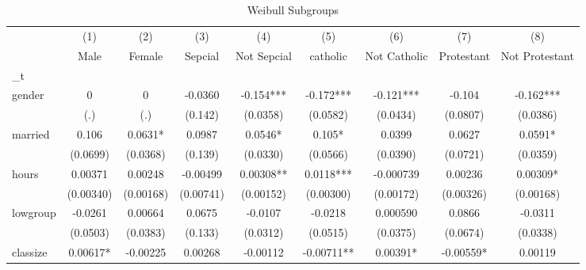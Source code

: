 \begin{table}[htbp]\centering
\def\sym#1{\ifmmode^{#1}\else\(^{#1}\)\fi}
\caption{Weibull Subgroups}
\begin{tabular}{l*{8}{c}}
\hline\hline
            &\multicolumn{1}{c}{(1)}&\multicolumn{1}{c}{(2)}&\multicolumn{1}{c}{(3)}&\multicolumn{1}{c}{(4)}&\multicolumn{1}{c}{(5)}&\multicolumn{1}{c}{(6)}&\multicolumn{1}{c}{(7)}&\multicolumn{1}{c}{(8)}\\
            &\multicolumn{1}{c}{Male}&\multicolumn{1}{c}{Female}&\multicolumn{1}{c}{Sepcial}&\multicolumn{1}{c}{Not Sepcial}&\multicolumn{1}{c}{catholic}&\multicolumn{1}{c}{Not Catholic}&\multicolumn{1}{c}{Protestant}&\multicolumn{1}{c}{Not Protestant}\\
\hline
\_t          &               &               &               &               &               &               &               &               \\
gender      &           0   &           0   &     -0.0360   &      -0.154***&      -0.172***&      -0.121***&      -0.104   &      -0.162***\\
            &         (.)   &         (.)   &     (0.142)   &    (0.0358)   &    (0.0582)   &    (0.0434)   &    (0.0807)   &    (0.0386)   \\
[1em]
married     &       0.106   &      0.0631*  &      0.0987   &      0.0546*  &       0.105*  &      0.0399   &      0.0627   &      0.0591*  \\
            &    (0.0699)   &    (0.0368)   &     (0.139)   &    (0.0330)   &    (0.0566)   &    (0.0390)   &    (0.0721)   &    (0.0359)   \\
[1em]
hours       &     0.00371   &     0.00248   &    -0.00499   &     0.00308** &      0.0118***&   -0.000739   &     0.00236   &     0.00309*  \\
            &   (0.00340)   &   (0.00168)   &   (0.00741)   &   (0.00152)   &   (0.00300)   &   (0.00172)   &   (0.00326)   &   (0.00168)   \\
[1em]
lowgroup    &     -0.0261   &     0.00664   &      0.0675   &     -0.0107   &     -0.0218   &    0.000590   &      0.0866   &     -0.0311   \\
            &    (0.0503)   &    (0.0383)   &     (0.133)   &    (0.0312)   &    (0.0515)   &    (0.0375)   &    (0.0674)   &    (0.0338)   \\
[1em]
classize    &     0.00617*  &    -0.00225   &     0.00268   &    -0.00112   &    -0.00711** &     0.00391*  &    -0.00559*  &     0.00119   \\

\end{tabular}
\end{table}
